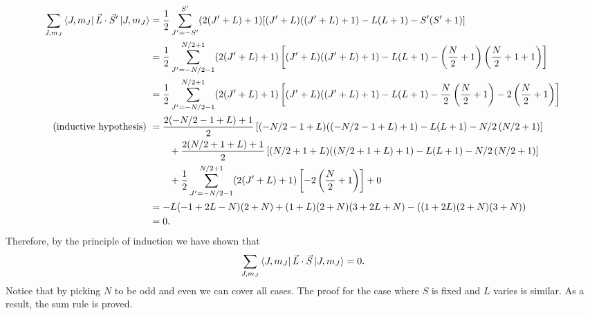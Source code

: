 \documentclass{article}
\theoremstyle{definition}
\newcommand{\f}[2]{\frac{#1}{#2}}
\newcommand{\lp}{\left(}
\newcommand{\rp}{\right)}
\newcommand{\lb}{\left[}
\newcommand{\rb}{\right]}
\begin{document}
\begin{enumerate}[label=(\alph*)]
\begin{align*}
	\sum_{J,m_J} \bra{J,m_J} \vec{L}\cdot \vec{S}' \ket{J,m_J} 
	&= \f{1}{2} \sum_{J'={-S'}}^{{S'}} (2 (J' + L) + 1)[(J' + L) ((J' + L) + 1) - L (L + 1) - S' (S' + 1)] \\
	&= \f{1}{2} \sum_{J'={-N/2-1}}^{{N/2+1}} (2 (J' + L) + 1)\lb (J' + L) ((J' + L) + 1) - L (L + 1) - \lp \f{N}{2} + 1\rp \lp \f{N}{2} + 1 + 1\rp \rb \\
	&= \f{1}{2} \sum_{J'={-N/2-1}}^{{N/2+1}} (2 (J' + L) + 1)\lb (J' + L) ((J' + L) + 1) - L (L + 1) - \f{N}{2}\lp \f{N}{2} + 1 \rp - 2\lp \f{N}{2} + 1 \rp\rb \\
	\text{(inductive hypothesis)  }&= \f{2 (-N/2-1 + L) + 1}{2}\lb (-N/2-1 + L) ((-N/2-1 + L) + 1) - L (L + 1) - N/2\lp N/2 + 1 \rp\rb \\
	&\quad\quad + \f{2 (N/2+1 + L) + 1}{2}\lb (N/2+1 + L) ((N/2+1 + L) + 1) - L (L + 1) - N/2\lp N/2 + 1 \rp\rb \\
	&\quad\quad + \f{1}{2}\sum_{J'=-N/2-1}^{N/2+1} (2 (J' + L) + 1) \lb -2\lp \f{N}{2}+1 \rp \rb + 0 \\
	&= -L (-1 + 2 L - N) (2 + N) + (1 + L) (2 + N) (3 + 2 L + N) -((1 + 2 L) (2 + N) (3 + N)) \\
	&= 0. 
	\end{align*}
	Therefore, by the principle of induction we have shown that 
	\begin{align*}
	\sum_{J,m_J} \bra{J,m_J} \vec{L}\cdot \vec{S} \ket{J,m_J}  = 0.
	\end{align*}
	Notice that by picking $N$ to be odd and even we can cover all cases. The proof for the case where $S$ is fixed and $L$ varies is similar.  As a result, the sum rule is proved. 
	

\end{enumerate}
\end{document}
